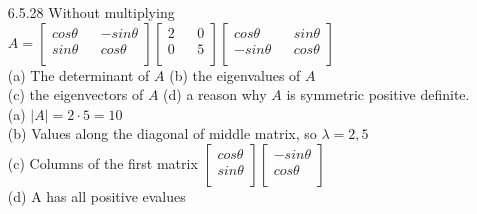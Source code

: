 \documentclass[10pt,twoside,reqno]{article}
\begin{document}
\begin{enumerate}
\vspace{3mm}
(c) A diagonal matrix with positive diagonal entries is positive definite.\\
It has positive evalues and pivots\\

\vspace{3mm}
(d) A symmetric matrix with a positive determinant might not be positive definite!\\
It could have two negative evalues because the det $= \pi_i \lambda_i$\\

\vspace{3mm}
\item[6.5.28] Without multiplying
$
$$
A =
\begin{bmatrix}
cos\theta && -sin\theta\\
sin\theta && cos\theta \\
\end{bmatrix}
\begin{bmatrix}
2 && 0\\
0 && 5\\
\end{bmatrix}
\begin{bmatrix}
cos\theta && sin\theta\\
-sin\theta && cos\theta \\
\end{bmatrix}
$$
$\\
(a) The determinant of $A$ \hspace{5mm} (b) the eigenvalues of $A$\\
(c) the eigenvectors of $A$ \hspace{6.5mm} (d) a reason why $A$ is symmetric positive definite.\\
(a) $\lvert A \rvert = 2 \cdot 5 = 10$\\
(b) Values along the diagonal of middle matrix, so $\lambda = 2, 5$\\
(c) Columns of the first matrix
$
$$
\begin{bmatrix}
cos\theta\\
sin\theta\\
\end{bmatrix}
\begin{bmatrix}
-sin\theta\\
cos\theta\\
\end{bmatrix}
$$
$\\
(d) A has all positive evalues\\

\vspace{3mm}
\end{enumerate}
\end{document}
